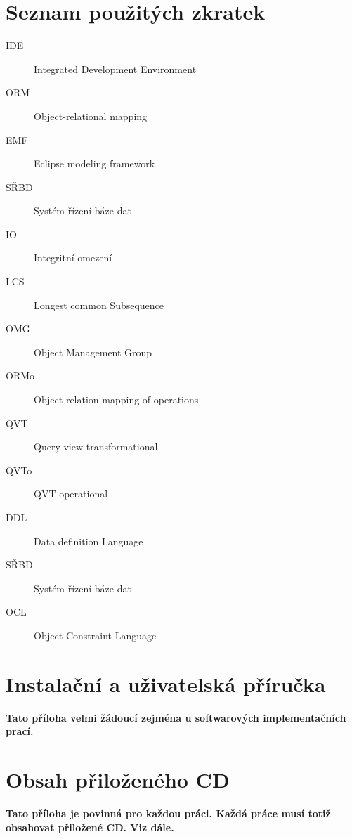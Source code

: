 \documentclass[11pt,twoside,a4paper]{book}
\begin{document}
\chapter{Seznam použitých zkratek}\label{chapt:seznam_zkratek}

\begin{description}
\item[IDE] Integrated Development Environment
\item[ORM] Object-relational mapping
\item[EMF] Eclipse modeling framework
\item[SŘBD] Systém řízení báze dat
\item[IO] Integritní omezení
\item[LCS] Longest common Subsequence
\item[OMG] Object Management Group
\item[ORMo] Object-relation mapping of operations
\item[QVT]  Query view transformational
\item[QVTo] QVT operational
\item[DDL] Data definition Language
\item[SŘBD] Systém řízení báze dat
\item[OCL] Object Constraint Language
\end{description}


\chapter{Instalační a uživatelská příručka}\label{chapt:manual}
\textbf{\large Tato příloha velmi žádoucí zejména u softwarových implementačních prací.}

\chapter{Obsah přiloženého CD}\label{chapt:obsah_cd}
\textbf{\large Tato příloha je povinná pro každou práci. Každá práce musí totiž obsahovat přiložené CD. Viz dále.}
\end{document}
